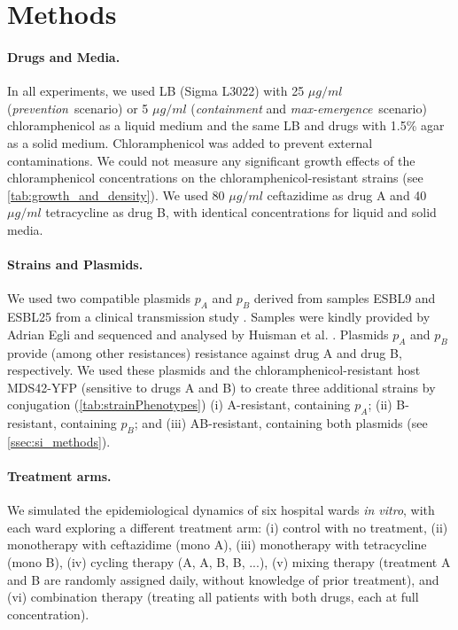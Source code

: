 
\section{Methods}
\paragraph{Drugs and Media.}
In all experiments, we used LB (Sigma L3022) with 25 $\mu g/ml$ (\textit{prevention}~scenario) or 5 $\mu g/ml$ (\textit{containment} and \textit{max-emergence}~scenario) chloramphenicol as a liquid medium and the same LB and drugs with 1.5\% agar as a solid medium.
Chloramphenicol was added to prevent external contaminations. We could not measure any significant growth effects of the chloramphenicol concentrations on the chloramphenicol-resistant strains (see \autoref{tab:growth_and_density}).
We used 80 $\mu g/ml$ ceftazidime as drug A and 40 $\mu g/ml$ tetracycline as drug B, with identical concentrations for liquid and solid media.

\paragraph{Strains and Plasmids.}
We used two compatible plasmids $p_A$ and $p_B$ derived from samples ESBL9 and ESBL25 from a clinical transmission study \cite{Sutter2016}.
Samples were kindly provided by Adrian Egli and sequenced and analysed by Huisman et al. \cite{Huisman2022}.
Plasmids $p_A$ and $p_B$ provide (among other resistances) resistance against drug A and drug B, respectively.
We used these plasmids and the chloramphenicol-resistant host MDS42-YFP \cite{Feher2012} (sensitive to drugs A and B) to create three additional strains by conjugation (\autoref{tab:strainPhenotypes}) (i) A-resistant, containing $p_A$; (ii) B-resistant, containing $p_B$; and (iii) AB-resistant, containing both plasmids (see \autoref{ssec:si_methods}).

\paragraph{Treatment arms.}
We simulated the epidemiological dynamics of six hospital wards \textit{in vitro}, with each ward exploring a different treatment arm:
(i) control with no treatment, (ii) monotherapy with ceftazidime (mono A), (iii) monotherapy with tetracycline (mono B), (iv) cycling therapy (A, A, B, B, ...), (v) mixing therapy (treatment A and B are randomly assigned daily, without knowledge of prior treatment), and (vi) combination therapy (treating all patients with both drugs, each at full concentration).

